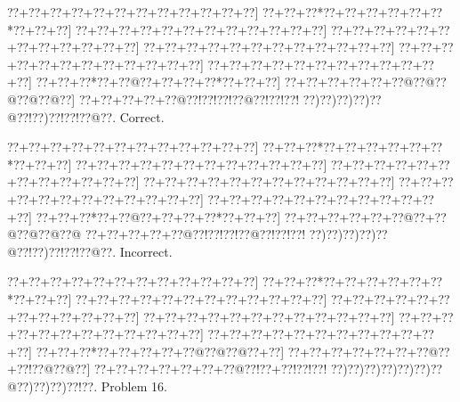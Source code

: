 \documentclass[a5paper]{article}
\begin{document}
\begin{center}
{\goo
\0??+\0??+\0??+\0??+\0??+\0??+\0??+\0??+\0??+\0??+\0??+\0??]
\0??+\0??+\0??*\0??+\0??+\0??+\0??+\0??+\0??*\0??+\0??+\0??]
\0??+\0??+\0??+\0??+\0??+\0??+\0??+\0??+\0??+\0??+\0??+\0??]
\0??+\0??+\0??+\0??+\0??+\0??+\0??+\0??+\0??+\0??+\0??+\0??]
\0??+\0??+\0??+\0??+\0??+\0??+\0??+\0??+\0??+\0??+\0??+\0??]
\0??+\0??+\0??+\0??+\0??+\0??+\0??+\0??+\0??+\0??+\0??+\0??]
\0??+\0??+\0??+\0??+\0??+\0??+\0??+\0??+\0??+\0??+\0??+\0??]
\0??+\0??+\0??*\0??+\0??@\0??+\0??+\0??+\0??*\0??+\0??+\0??]
\0??+\0??+\0??+\0??+\0??+\0??@\0??@\0??@\0??@\0??@\0??]
\0??+\0??+\0??+\0??+\0??@\0??!\0??!\0??!\0??@\0??!\0??!\0??!
\0??)\0??)\0??)\0??)\0??@\0??!\0??)\0??!\0??!\0??@\0??.
}
Correct. 

\end{center}
\begin{center}
{\goo
\0??+\0??+\0??+\0??+\0??+\0??+\0??+\0??+\0??+\0??+\0??+\0??]
\0??+\0??+\0??*\0??+\0??+\0??+\0??+\0??+\0??*\0??+\0??+\0??]
\0??+\0??+\0??+\0??+\0??+\0??+\0??+\0??+\0??+\0??+\0??+\0??]
\0??+\0??+\0??+\0??+\0??+\0??+\0??+\0??+\0??+\0??+\0??+\0??]
\0??+\0??+\0??+\0??+\0??+\0??+\0??+\0??+\0??+\0??+\0??+\0??]
\0??+\0??+\0??+\0??+\0??+\0??+\0??+\0??+\0??+\0??+\0??+\0??]
\0??+\0??+\0??+\0??+\0??+\0??+\0??+\0??+\0??+\0??+\0??+\0??]
\0??+\0??+\0??*\0??+\0??@\0??+\0??+\0??+\0??*\0??+\0??+\0??]
\0??+\0??+\0??+\0??+\0??+\0??@\0??+\0??@\0??@\0??@\0??@
\0??+\0??+\0??+\0??+\0??@\0??!\0??!\0??!\0??@\0??!\0??!\0??!
\0??)\0??)\0??)\0??)\0??@\0??!\0??)\0??!\0??!\0??@\0??.
}
Incorrect. 

\end{center}
\newpage
\begin{center}
{\goo
\0??+\0??+\0??+\0??+\0??+\0??+\0??+\0??+\0??+\0??+\0??+\0??]
\0??+\0??+\0??*\0??+\0??+\0??+\0??+\0??+\0??*\0??+\0??+\0??]
\0??+\0??+\0??+\0??+\0??+\0??+\0??+\0??+\0??+\0??+\0??+\0??]
\0??+\0??+\0??+\0??+\0??+\0??+\0??+\0??+\0??+\0??+\0??+\0??]
\0??+\0??+\0??+\0??+\0??+\0??+\0??+\0??+\0??+\0??+\0??+\0??]
\0??+\0??+\0??+\0??+\0??+\0??+\0??+\0??+\0??+\0??+\0??+\0??]
\0??+\0??+\0??+\0??+\0??+\0??+\0??+\0??+\0??+\0??+\0??+\0??]
\0??+\0??+\0??*\0??+\0??+\0??+\0??+\0??@\0??@\0??@\0??+\0??]
\0??+\0??+\0??+\0??+\0??+\0??+\0??@\0??+\0??!\0??@\0??@\0??]
\0??+\0??+\0??+\0??+\0??+\0??+\0??@\0??!\0??+\0??!\0??!\0??!
\0??)\0??)\0??)\0??)\0??)\0??)\0??@\0??)\0??)\0??)\0??!\0??.
}
Problem 16.

\end{center}
\end{document}
